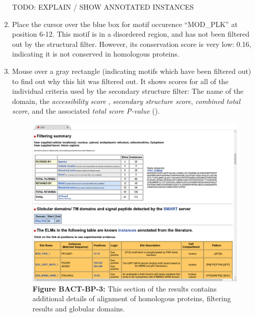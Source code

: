 \begin{enumerate}
TODO: EXPLAIN / SHOW ANNOTATED INSTANCES


\item Place the cursor over the blue box for motif occurence ``MOD\_PLK'' at
	position 6-12. This motif is in a disordered region, and has not been
	filtered out by the structural filter. However, its conservation score
	is very low: 0.16, indicating it is not conserved in homologous
	proteins.


\item Mouse over a gray rectangle (indicating motifs which have been filtered
	out) to find out why this hit was filtered out. It shows scores for all
	of the individual criteria used by the secondary structure filter: The
	name of the domain, the \emph{accessibility score} , \emph{secondary
	structure score}, \emph{combined total score}, and the associated
	\emph{total score P-value} (\cite{19852836}).

\begin{figure}[h!]
	\centering
	\includegraphics[width=\textwidth]{Figures/predicting_p53/elm_results_alignments_filtering_domains.png}
	\caption{
	\textbf{Figure BACT-BP-3:}
	This section of the results contains
	additional details of alignment of homologous proteins, filtering
	results and globular domains.
	}
	\label{fig:predicting_p53_elm_results_alignemnt_filtering_domains}
\end{figure}


\end{enumerate}
